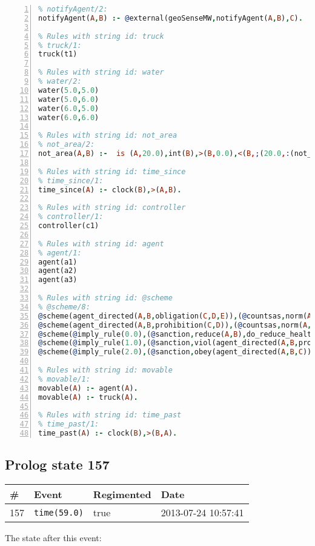 \documentclass[11pt]{article}\usepackage[utf8]{inputenc}\usepackage{geometry}
\begin{document}
\begin{lstlisting}[language=Prolog, numbers=left]
% Rules with string id: notifyAgent
% notifyAgent/2:
notifyAgent(A,B) :- @external(geoSenseMW,notifyAgent(A,B),C).

% Rules with string id: truck
% truck/1:
truck(t1)

% Rules with string id: water
% water/2:
water(5.0,5.0)
water(5.0,6.0)
water(6.0,5.0)
water(6.0,6.0)

% Rules with string id: not_area
% not_area/2:
not_area(A,B) :-  is (A,20.0),int(B),>(B,0.0),<(B,;(20.0,:(not_area(A,B), is (-(B),20.0)))),int(A),>(A,0.0),<(A,;(20.0,:(area(A,B),-(int(A))))),int(B),>(A,0.0),>(B,0.0),<(A,21.0),<(B,21.0).

% Rules with string id: time_since
% time_since/1:
time_since(A) :- clock(B),>(A,B).

% Rules with string id: controller
% controller/1:
controller(c1)

% Rules with string id: agent
% agent/1:
agent(a1)
agent(a2)
agent(a3)

% Rules with string id: @scheme
% @scheme/8:
@scheme(agent_directed(A,B,obligation(C,D,E)),(@countsas,norm(A,B,F,obligation(C,D,E)),F),false,(listTrue(C)),(time_past(D)),false,[plus(viol(agent_directed(A,B,obligation(C,D,E))))|[]],[plus(obey(agent_directed(A,B,obligation(C,D,E))))|[]])
@scheme(agent_directed(A,B,prohibition(C,D)),(@countsas,norm(A,B,E,prohibition(C,D)),E),(listTrue(C)),false,(false),false,[plus(viol(agent_directed(A,B,prohibition(C,D))))|[]],[plus(obey(agent_directed(A,B,prohibition(C,D))))|[]])
@scheme(@imply_rule(0.0),(@sanction,reduce(A,B),do_reduce_health(A,B),notifyAgent(A,changed(status))),true,false,false,false,[min(reduce(A,B))|[]],[])
@scheme(@imply_rule(1.0),(@sanction,viol(agent_directed(A,B,prohibition(C,D))),do_sanction(D)),true,false,false,false,[min(viol(agent_directed(A,B,prohibition(C,D))))|[]],[])
@scheme(@imply_rule(2.0),(@sanction,obey(agent_directed(A,B,C))),true,false,false,false,[min(obey(agent_directed(A,B,C)))|[]],[])

% Rules with string id: movable
% movable/1:
movable(A) :- agent(A).
movable(A) :- truck(A).

% Rules with string id: time_past
% time_past/1:
time_past(A) :- clock(B),>(B,A).

\end{lstlisting}
\clearpage 
\subsection{Prolog state 157}
\begin{table}[ht]
\centering 
\begin{tabular}{l l l l} 
\textbf{\#} & \textbf{Event} & \textbf{Regimented} & \textbf{Date} \\ [0.5ex] 
\hline
157&\texttt{time(59.0)}&true&2013-07-24 10:57:41\\ [1ex] \hline\end{tabular}
\end{table}
The state after this event:
\end{document}

